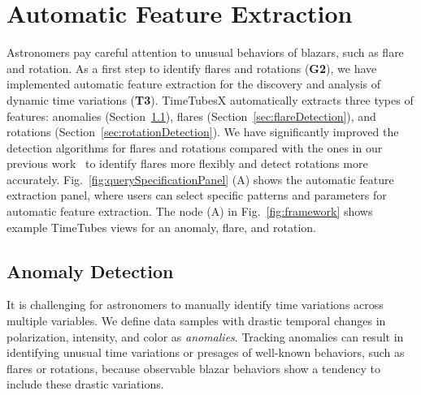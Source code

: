 \section{Automatic Feature Extraction}\label{sec:automaticExtraction}
Astronomers pay careful attention to unusual behaviors of blazars, such as flare and rotation.
As a first step to identify flares and rotations (\textbf{G2}),
we have implemented automatic feature extraction for the discovery and analysis of dynamic time variations (\textbf{T3}).
TimeTubesX automatically extracts three types of features: anomalies (Section~\ref{sec:anomalyDetection}), flares (Section~\ref{sec:flareDetection}), and rotations (Section~\ref{sec:rotationDetection}).
We have significantly improved the detection algorithms for flares and rotations compared with the ones in our previous work~\cite{Sawada2018} 
to identify flares more flexibly and detect rotations more accurately.
Fig.~\ref{fig:querySpecificationPanel} (A) shows the automatic feature extraction panel, %
where users can select specific patterns and parameters for automatic feature extraction.
The node (A) in Fig.~\ref{fig:framework} shows example TimeTubes views for an anomaly, flare, and rotation.

\subsection{Anomaly Detection}\label{sec:anomalyDetection}
It is challenging for astronomers to manually identify time variations across multiple variables. 
We define data samples with drastic temporal changes in polarization, intensity, and color as \textit{anomalies}.
Tracking anomalies can result in identifying unusual time variations or presages of well-known behaviors, such as flares or rotations,
because observable blazar behaviors show a tendency to include these drastic variations.

